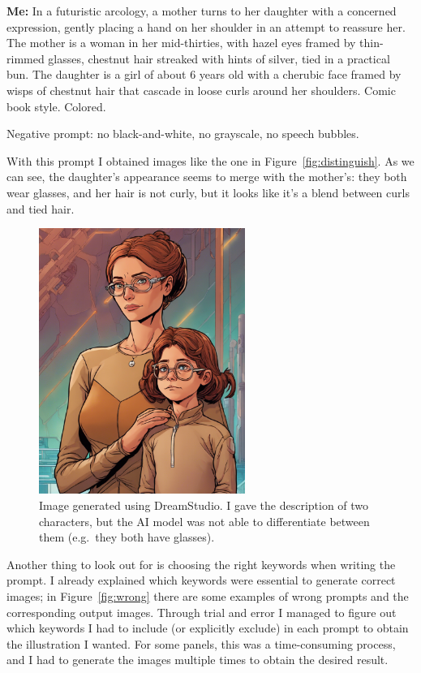 \documentclass[a4paper,11pt]{article}
\newenvironment{shadedquotation3}
    {\colorlet{shadecolor}{Purple!15}\begin{shaded*}
    \quoting[leftmargin=0cm, rightmargin=0cm, vskip=0pt]
    }
    {\endquoting
    \end{shaded*}
}
\begin{document}
\begin{shadedquotation3}
    \textbf{Me:} In a futuristic arcology, a mother turns to her daughter with a concerned expression, gently placing a hand on her shoulder in an attempt to reassure her. The mother is a woman in her mid-thirties, with hazel eyes framed by thin-rimmed glasses, chestnut hair streaked with hints of silver, tied in a practical bun. The daughter is a girl of about 6 years old with a cherubic face framed by wisps of chestnut hair that cascade in loose curls around her shoulders. Comic book style. Colored.\smallskip 

    \noindent Negative prompt: no black-and-white, no grayscale,  no speech bubbles.
\end{shadedquotation3}

With this prompt I obtained images like the one in Figure~\vref{fig:distinguish}. As we can see, the daughter's appearance seems to merge with the mother's:  they both wear glasses, and her hair is not curly, but it looks like it's a blend between curls and tied hair. 

\begin{figure}[htb]
    \centering
    \includegraphics[width=0.6\textwidth]{figures/no-distinguish-between-people.png}
    \caption{Image generated using DreamStudio. I gave the description of two characters, but the AI model was not able to differentiate between them (e.g.~they both have glasses).}
    \label{fig:distinguish}
\end{figure}

Another thing to look out for is choosing the right keywords when writing the prompt. I already explained which keywords were essential to generate correct images; in Figure~\vref{fig:wrong} there are some examples of wrong prompts and the corresponding output images. Through trial and error I managed to figure out which keywords I had to include (or explicitly exclude) in each prompt to obtain the illustration I wanted. For some panels, this was a time-consuming process, and I had to generate the images multiple times to obtain the desired result.\medskip
\end{document}
